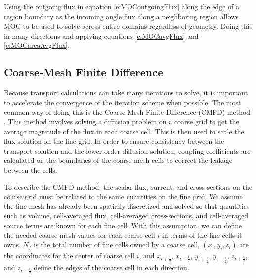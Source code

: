Using the outgoing flux in equation \ref{e:MOCoutgoingFlux} along the edge of a region boundary as the incoming angle flux along a neighboring region allows MOC to be used to solve across entire domains regardless of geometry.  Doing this in many directions and applying equations \ref{e:MOCavgFlux} and \ref{e:MOCareaAvgFlux}.

\subsection{Coarse-Mesh Finite Difference}\label{ss:CMFD}

Because transport calculations can take many iterations to solve, it is important to accelerate the convergence of the iteration scheme when possible.  The most common way of doing this is the Coarse-Mesh Finite Difference (CMFD) method \cite{SmithCMFDOrig}.  This method involves solving a diffusion problem on a coarse grid to get the average magnitude of the flux in each coarse cell.  This is then used to scale the flux solution on the fine grid.  In order to ensure consistency between the transport solution and the lower order diffusion solution, coupling coefficients are calculated on the boundaries of the coarse mesh cells to correct the leakage between the cells.

To describe the CMFD method, the scalar flux, current, and cross-sections on the coarse grid must be related to the same quantities on the fine grid.  We assume the fine mesh has already been spatially discretized and solved so that quantities such as volume, cell-averaged flux, cell-averaged cross-sections, and cell-averaged source terms are known for each fine cell.  With this assumption, we can define the needed coarse mesh values for each coarse cell $i$ in terms of the fine cells it owns.  $N_f$ is the total number of fine cells owned by a coarse cell, $\left(x_i,y_i,z_i\right)$ are the coordinates for the center of coarse cell $i$, and $x_{i+\frac{1}{2}}$, $x_{i-\frac{1}{2}}$, $y_{i+\frac{1}{2}}$, $y_{i-\frac{1}{2}}$, $z_{i+\frac{1}{2}}$, and $z_{i-\frac{1}{2}}$ define the edges of the coarse cell in each direction.

